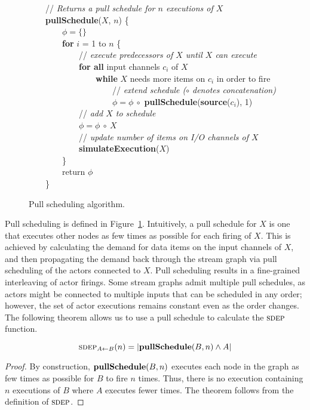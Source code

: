 \begin{figure}[t]
\begin{center}
\parbox{3.8in}{
\mbox{} ~~~~// {\it Returns a pull schedule for $n$ executions of $X$} \\
\mbox{} ~~~~{\bf pullSchedule}($X$, $n$) \{\\
\mbox{} ~~~~~~~~$\phi = \{ \}$ \\
\mbox{} ~~~~~~~~{\bf for} $i$ = 1 to $n$ \{ \\
\mbox{} ~~~~~~~~~~~~// {\it execute predecessors of $X$ until $X$ can execute} \\
\mbox{} ~~~~~~~~~~~~{\bf for all} input channels $c_i$ of $X$ \\
\mbox{} ~~~~~~~~~~~~~~~~{\bf while} $X$ needs more items on $c_i$ in order to fire \\
\mbox{} ~~~~~~~~~~~~~~~~~~~~// {\it extend schedule ($\circ$ denotes concatenation)} \\
\mbox{} ~~~~~~~~~~~~~~~~~~~~$\phi = \phi ~\circ$ {\bf pullSchedule}({\bf source}($c_i$), 1) \\
\mbox{} ~~~~~~~~~~~~// {\it add $X$ to schedule} \\
\mbox{} ~~~~~~~~~~~~$\phi = \phi~\circ~X$ \\
\mbox{} ~~~~~~~~~~~~// {\it update number of items on I/O channels of $X$} \\
\mbox{} ~~~~~~~~~~~~{\bf simulateExecution}($X$) \\
\mbox{} ~~~~~~~~\} \\
\mbox{} ~~~~~~~~return $\phi$ \\
\mbox{} ~~~~\}
}
\end{center}
\caption{Pull scheduling algorithm.\protect\label{fig:pull-scheduling}}
\end{figure}

Pull scheduling is defined in Figure~\ref{fig:pull-scheduling}.
Intuitively, a pull schedule for $X$ is one that executes other nodes
as few times as possible for each firing of $X$.  This is achieved by
calculating the demand for data items on the input channels of $X$,
and then propagating the demand back through the stream graph via pull
scheduling of the actors connected to $X$.  Pull scheduling results in
a fine-grained interleaving of actor firings.  Some stream graphs
admit multiple pull schedules, as actors might be connected to
multiple inputs that can be scheduled in any order; however, the set
of actor executions remains constant even as the order changes.  The
following theorem allows us to use a pull schedule to calculate the
$\textsc{sdep}$ function.
\begin{theorem} 
\label{thm1}
\[
\textsc{sdep}_{A \small{\leftarrow} B}(n) = |{\bf pullSchedule}(B, n) \wedge A|
\]
\end{theorem}
\begin{proof}
By construction, ${\bf pullSchedule}(B, n)$ executes each node in the
graph as few times as possible for $B$ to fire $n$ times.  Thus, there
is no execution containing $n$ executions of $B$ where $A$ executes
fewer times.  The theorem follows from the definition of $\textsc{sdep}$.
\end{proof}

